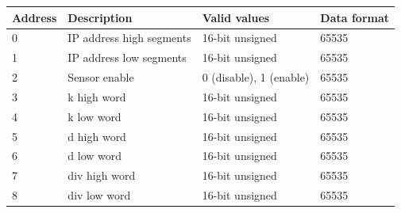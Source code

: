 \begin{tabular}{|l|l|l|l|}
\hline \textbf{Address} & \textbf{Description} & \textbf{Valid values} & \textbf{Data format} \\ 
\hline
\hline 0 & IP address high segments & 16-bit unsigned & 65535 \\ 
\hline 1 & IP address low segments & 16-bit unsigned & 65535 \\ 
\hline 2 & Sensor enable & 0 (disable), 1 (enable) & 65535 \\ 
\hline 3 & k high word & 16-bit unsigned & 65535 \\ 
\hline 4 & k low word & 16-bit unsigned & 65535 \\ 
\hline 5 & d high word & 16-bit unsigned & 65535 \\ 
\hline 6 & d low word & 16-bit unsigned & 65535 \\ 
\hline 7 & div high word & 16-bit unsigned & 65535 \\ 
\hline 8 & div low word & 16-bit unsigned & 65535 \\ 
\hline 
\end{tabular} 
